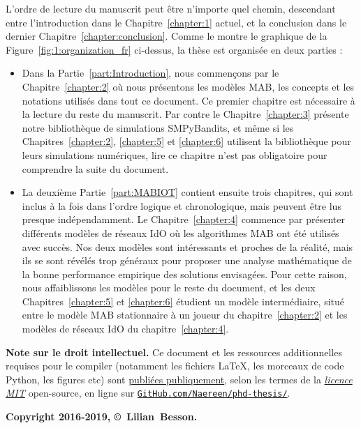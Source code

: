 \begin{resume_fr}
L'ordre de lecture du manuscrit peut être n'importe quel chemin, descendant entre l'introduction dans le Chapitre~\ref{chapter:1} actuel, et la conclusion dans le dernier Chapitre~\ref{chapter:conclusion}.
Comme le montre le graphique de la Figure~\ref{fig:1:organization_fr} ci-dessus,
la thèse est organisée en deux parties :

\begin{itemize}
    \item
Dans la Partie~\ref{part:Introduction}, nous commençons par le Chapitre~\ref{chapter:2} où nous présentons les modèles MAB, les concepts et les notations utilisés dans tout ce document. Ce premier chapitre est nécessaire à la lecture du reste du manuscrit.
Par contre le Chapitre~\ref{chapter:3} présente notre bibliothèque de simulations SMPyBandits, et même si les Chapitres~\ref{chapter:2}, \ref{chapter:5} et \ref{chapter:6} utilisent la bibliothèque pour leurs simulations numériques, lire ce chapitre n'est pas obligatoire pour comprendre la suite du document.

    \item
La deuxième Partie~\ref{part:MABIOT} contient ensuite trois chapitres, qui sont inclus à la fois dans l'ordre logique et chronologique, mais peuvent être lus presque indépendamment.
Le Chapitre~\ref{chapter:4} commence par présenter différents modèles de réseaux IdO où les algorithmes MAB ont été utilisés avec succès. Nos deux modèles sont intéressants et proches de la réalité, mais ils se sont révélés trop généraux pour proposer une analyse mathématique de la bonne performance empirique des solutions envisagées.
Pour cette raison, nous affaiblissons les modèles pour le reste du document,
et les deux Chapitres~\ref{chapter:5} et \ref{chapter:6} étudient un modèle intermédiaire, situé entre le modèle MAB stationnaire à un joueur du chapitre~\ref{chapter:2} et les modèles de réseaux IdO du chapitre~\ref{chapter:4}.
\end{itemize}


\vfill{}

\textbf{Note sur le droit intellectuel.}
%
Ce document et les ressources additionnelles requises pour le compiler (notamment les fichiers \LaTeX, les morceaux de code Python, les figures etc)
sont \href{https://github.com/Naereen/phd-thesis/}{publiées publiquement},
selon les termes de la \href{https://lbesson.mit-license.org/}{\emph{licence MIT}} open-source,
en ligne sur \href{https://github.com/Naereen/phd-thesis/}{\texttt{GitHub.com/Naereen/phd-thesis/}}.


\begin{center}
    \textbf{Copyright 2016-2019, \copyright ~Lilian~Besson.}
\end{center}


\end{resume_fr}
